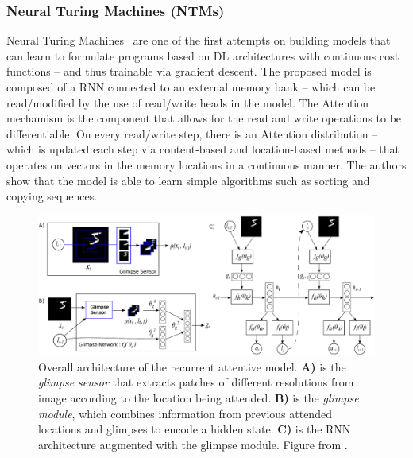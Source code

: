 \documentclass[12pt]{article}
\begin{document}
\subsubsection{Neural Turing Machines (NTMs)}
Neural Turing Machines~\cite{ref:ntm} are one of the first attempts on building models that can learn to
formulate programs based on DL architectures with continuous cost functions
-- and thus trainable via gradient descent.
The proposed model is composed of a RNN connected to an external memory bank -- which can be read/modified
by the use of read/write heads in the model.
The Attention mechamism is the component that allows for the read and write operations to be differentiable.
On every read/write step, there is an Attention distribution
-- which is updated each step via content-based and location-based methods --
that operates on vectors in the memory locations in a continuous manner.
The authors show that the model is able to learn simple algorithms such as sorting and copying sequences.

\begin{figure}
\begin{center}
    \includegraphics[width=1.0\linewidth]{./img/recurr_model.png}
\caption{
    Overall architecture of the recurrent attentive model.
    \textbf{A)} is the \emph{glimpse sensor} that extracts patches of different resolutions from image
    according to the location being attended.
    \textbf{B)} is the \emph{glimpse module}, which combines information from previous attended locations
    and glimpses to encode a hidden state.
    \textbf{C)} is the RNN architecture augmented with the glimpse module.
    Figure from \cite{ref:rec-models}.
}
\label{fig:recurr-model}
\end{center}
\end{figure}
\end{document}

